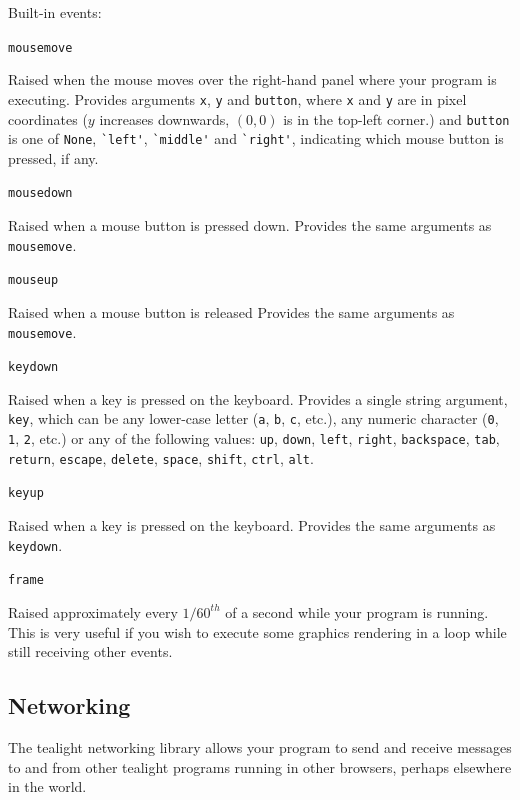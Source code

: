\documentclass[12pt,a4paper,twoside]{article}
\renewcommand{\_}{\texttt{\symbol{95}}}
\begin{document}
Built-in events:

\begin{bulletlist}
\item \verb^mousemove^

	Raised when the mouse moves over the right-hand panel where your program is executing. Provides arguments \verb^x^, \verb^y^ and \verb^button^, where \verb^x^ and \verb^y^ are in pixel coordinates ($y$ increases downwards, $(0,0)$ is in the top-left corner.) and \verb^button^ is one of \verb^None^, \verb^`left'^, \verb^`middle'^ and \verb^`right'^, indicating which mouse button is pressed, if any.

\item \verb^mousedown^

	Raised when a mouse button is pressed down. Provides the same arguments as \verb^mousemove^.
\item \verb^mouseup^

	Raised when a mouse button is released Provides the same arguments as \verb^mousemove^.
\item \verb^keydown^

	Raised when a key is pressed on the keyboard. Provides a single string argument, \verb^key^, which can be any lower-case letter (\verb^a^, \verb^b^, \verb^c^, etc.), any numeric character (\verb^0^, \verb^1^, \verb^2^, etc.) or any of the following values: \verb^up^, \verb^down^, \verb^left^, \verb^right^, \verb^backspace^, \verb^tab^, \verb^return^, \verb^escape^, \verb^delete^, \verb^space^, \verb^shift^, \verb^ctrl^, \verb^alt^.
\item \verb^keyup^

	Raised when a key is pressed on the keyboard. Provides the same arguments as \verb^keydown^.
\item \verb^frame^

	Raised approximately every ${1/60}^{th}$ of a second while your program is running. This is very useful if you wish to execute some graphics rendering in a loop while still receiving other events.
\end{bulletlist}

\subsection{Networking} \label{sec:networking-functions}

The tealight networking library allows your program to send and receive messages to and from other tealight programs running in other browsers, perhaps elsewhere in the world.
\end{document}
